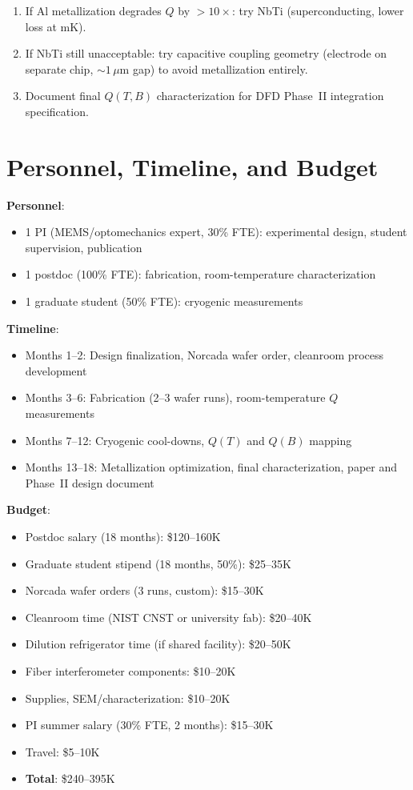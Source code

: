 \documentclass[11pt]{article}
\begin{document}
\begin{enumerate}[nosep]
\item If Al metallization degrades $Q$ by $> 10\times$: try NbTi
  (superconducting, lower loss at mK).
\item If NbTi still unacceptable: try capacitive coupling geometry
  (electrode on separate chip, $\sim 1$\,$\mu$m gap) to avoid
  metallization entirely.
\item Document final $Q(T, B)$ characterization for DFD Phase~II
  integration specification.
\end{enumerate}

\section{Personnel, Timeline, and Budget}

\textbf{Personnel}:
\begin{itemize}[nosep]
\item 1 PI (MEMS/optomechanics expert, 30\% FTE): experimental design,
  student supervision, publication
\item 1 postdoc (100\% FTE): fabrication, room-temperature characterization
\item 1 graduate student (50\% FTE): cryogenic measurements
\end{itemize}

\textbf{Timeline}:
\begin{itemize}[nosep]
\item Months 1--2: Design finalization, Norcada wafer order, cleanroom
  process development
\item Months 3--6: Fabrication (2--3 wafer runs), room-temperature $Q$
  measurements
\item Months 7--12: Cryogenic cool-downs, $Q(T)$ and $Q(B)$ mapping
\item Months 13--18: Metallization optimization, final characterization,
  paper and Phase~II design document
\end{itemize}

\textbf{Budget}:
\begin{itemize}[nosep]
\item Postdoc salary (18 months): \$120--160K
\item Graduate student stipend (18 months, 50\%): \$25--35K
\item Norcada wafer orders (3 runs, custom): \$15--30K
\item Cleanroom time (NIST CNST or university fab): \$20--40K
\item Dilution refrigerator time (if shared facility): \$20--50K
\item Fiber interferometer components: \$10--20K
\item Supplies, SEM/characterization: \$10--20K
\item PI summer salary (30\% FTE, 2 months): \$15--30K
\item Travel: \$5--10K
\item \textbf{Total}: \$240--395K
\end{itemize}
\end{document}
